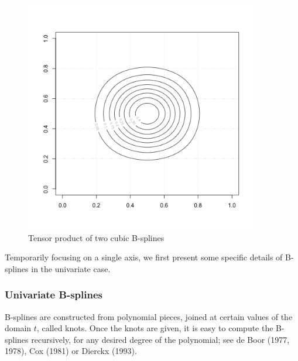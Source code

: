\documentclass[12pt]{article}
\newcommand*\needsparaphrased{\color{red}}
\newcommand*\outlineskeleton{\color{green}}
\begin{document}
\begin{figure}[H]
  \centering
  \graphicspath{{img/}}
  \includegraphics[width=4in, height=4in]{bicubic_bspline_contour.png}
  \caption{Tensor product of two cubic B-splines}\label{fig:bicubic_bspline_contour}
\end{figure} 

Temporarily focusing on a single axis, we first present some specific details of B-splines in the univariate case. 
\subsubsection{{\outlineskeleton Univariate B-splines}}

{\needsparaphrased B-splines are constructed from polynomial pieces, joined at certain values of the domain $t$, called knots. Once the knots are given, it is easy to compute the B-splines recursively, for any desired degree of the polynomial; see de Boor (1977, 1978), Cox (1981) or Dierckx (1993).  }
\end{document}
